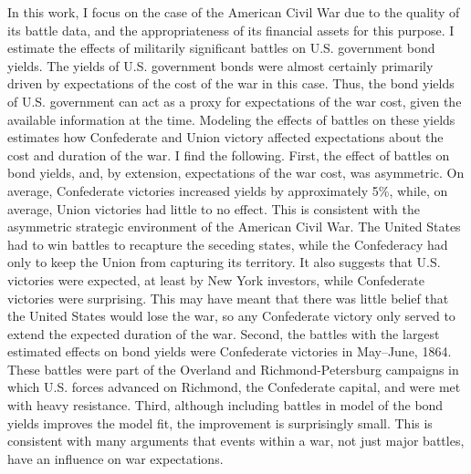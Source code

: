 In this work, I focus on the case of the American Civil War due to the quality of its battle data, and the appropriateness of its financial assets for this purpose.
I estimate the effects of militarily significant battles on U.S. government bond yields.
The yields of U.S. government bonds were almost certainly primarily driven by expectations of the cost of the war in this case.
Thus, the bond yields of U.S. government can act as a proxy for expectations of the war cost, given the available information at the time.
Modeling the effects of battles on these yields estimates how Confederate and Union victory affected expectations about the cost and duration of the war.
I find the following.
First, the effect of battles on bond yields, and, by extension, expectations of the war cost, was asymmetric.
On average, Confederate victories increased yields by approximately 5\%, while, on average, Union victories had little to no effect.
This is consistent with the asymmetric strategic environment of the American Civil War.
The United States had to win battles to recapture the seceding states, while the Confederacy had only to keep the Union from capturing its territory.
It also suggests that U.S. victories were expected, at least by New York investors, while Confederate victories were surprising.
This may have meant that there was little belief that the United States would lose the war, so any Confederate victory only served to extend the expected duration of the war.
Second, the battles with the largest estimated effects on bond yields were Confederate victories in May--June, 1864.
These battles were part of the Overland and Richmond-Petersburg campaigns in which U.S. forces advanced on Richmond, the Confederate capital, and were met with heavy resistance.
Third, although including battles in model of the bond yields improves the model fit, the improvement is surprisingly small.
This is consistent with many arguments that events within a war, not just major battles, have an influence on war expectations.

